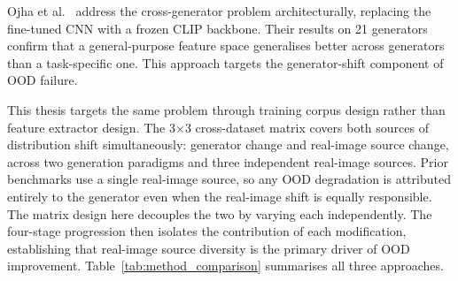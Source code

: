 Ojha et al.~\cite{ojha2023} address the cross-generator problem architecturally, replacing
the fine-tuned CNN with a frozen CLIP backbone. Their results on 21 generators confirm
that a general-purpose feature space generalises better across generators than a
task-specific one. This approach targets the generator-shift component of OOD failure.

This thesis targets the same problem through training corpus design rather than feature
extractor design. The 3$\times$3 cross-dataset matrix covers both sources of distribution
shift simultaneously: generator change and real-image source change, across two generation
paradigms and three independent real-image sources. Prior benchmarks use a single
real-image source, so any OOD degradation is attributed entirely to the generator even
when the real-image shift is equally responsible. The matrix design here decouples the
two by varying each independently. The four-stage progression then isolates the
contribution of each modification, establishing that real-image source diversity is the
primary driver of OOD improvement. Table~\ref{tab:method_comparison} summarises all three
approaches.

\begin{table}[htb]
  \centering
  \caption{Comparison of three detection approaches along key evaluation dimensions.}
  \label{tab:method_comparison}
\end{table}
